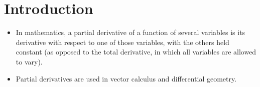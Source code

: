 \documentclass{beamer}
\begin{document}
	\begin{frame}
		\tableofcontents
	\end{frame}
\section{Introduction}
\begin{frame}
\begin{itemize}
\item In mathematics, a partial derivative of a function of several variables is its derivative with respect to one of those variables, with the others held constant (as opposed to the total derivative, in which all variables are allowed to vary). \item Partial derivatives are used in vector calculus and differential geometry.
\end{itemize}

\end{frame}
\end{document}
